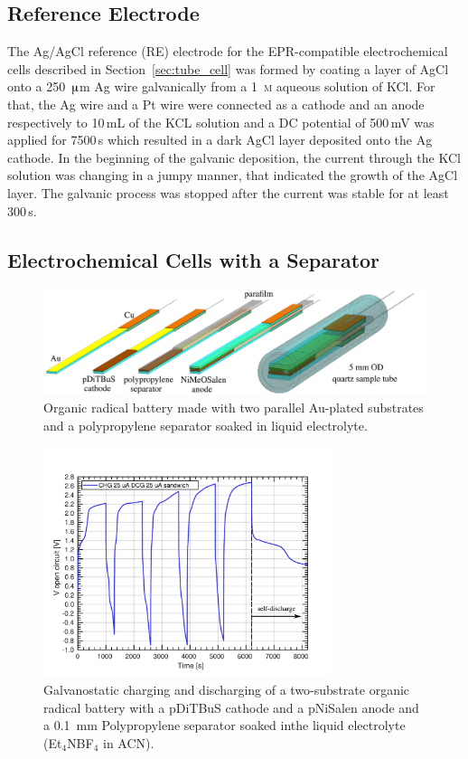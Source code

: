 \subsection{Reference Electrode}
\label{sec:re_prep}
The Ag/AgCl reference (RE) electrode for the EPR-compatible electrochemical cells described in Section~\ref{sec:tube_cell} was formed by coating a layer of AgCl onto a 250~$\muup$m Ag wire galvanically from a 1~\textsc{m} aqueous solution of KCl. For that, the Ag wire and a Pt wire were connected as a cathode and an anode respectively to 10$\,$mL of the KCL solution and a DC potential of 500$\,$mV was applied for 7500$\,$s which resulted in a dark AgCl layer deposited onto the Ag cathode. In the beginning of the galvanic deposition, the current through the KCl solution was changing in a jumpy manner, that indicated the growth of the AgCl layer. The galvanic process was stopped after the current was stable for at least 300$\,$s.\\

\subsection{Electrochemical Cells with a Separator}
\begin{figure}[h]
\center
	\includegraphics[width=1\textwidth]{./operando_epr/figures/sandwich/sandwich.pdf}
	\caption{Organic radical battery made with two parallel Au-plated substrates and a polypropylene separator soaked in liquid electrolyte.}
	\label{fig:sandwich_assembly}
\end{figure}

\begin{figure}[h]
\center
	\includegraphics[width=0.75\textwidth]{./materials/figures/SANDWICH_ACN_GCD.pdf}
	\caption{Galvanostatic charging and discharging of a two-substrate organic radical battery with a pDiTBuS cathode and a pNiSalen anode and a 0.1~mm Polypropylene separator soaked inthe liquid electrolyte (Et$_4$NBF$_4$ in ACN).}
	\label{fig:transistor_battery_GCD}
\end{figure}


